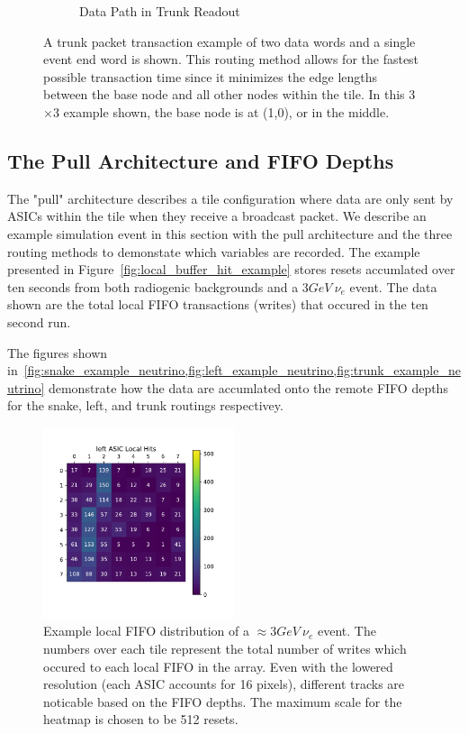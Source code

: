 \begin{figure}
\begin{subfigure}{.5\textwidth}
  \caption{Data Path in Trunk Readout}
\end{subfigure}
\caption{A trunk packet transaction example of two data words and a single event end word is shown. 
This routing method allows for the fastest possible transaction time since it minimizes the edge lengths between the base node and all other nodes within the tile.
In this 3$\times$3 example shown, the base node is at (1,0), or in the middle.}
\label{fig:trunk_packet_drift}
\end{figure}


\subsection{The Pull Architecture and FIFO Depths}

The "pull" architecture describes a tile configuration where data are only sent by ASICs within the tile when they receive a broadcast packet.
We describe an example simulation event in this section with the pull architecture and the three routing methods to demonstate which variables are recorded.
The example presented in Figure~\ref{fig:local_buffer_hit_example} stores resets accumlated over ten seconds from both radiogenic backgrounds and a 3$\unit{GeV}~\nu_{e}$ event.
The data shown are the total local FIFO transactions (writes) that occured in the ten second run.

The figures shown in~\cref{fig:snake_example_neutrino,fig:left_example_neutrino,fig:trunk_example_neutrino} demonstrate how the data are accumlated onto the remote FIFO depths for the snake, left, and trunk routings respectivey.

\begin{figure}[]
\centering
\includegraphics[width=0.5\textwidth]{images/left_asic_local.pdf}
\caption{Example local FIFO distribution of a $\approx 3\unit{GeV}~\nu_{e}$ event.
The numbers over each tile represent the total number of writes which occured to each local FIFO in the array.
Even with the lowered resolution (each ASIC accounts for 16 pixels), different tracks are noticable based on the FIFO depths.
The maximum scale for the heatmap is chosen to be 512 resets.
}
\end{figure}~\label{fig:local_buffer_hit_example}

